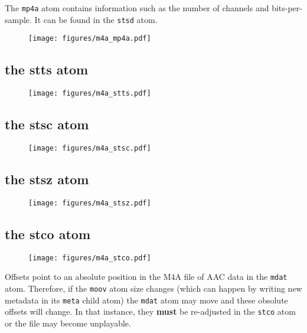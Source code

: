 The \texttt{mp4a} atom contains information such as the number of channels
and bits-per-sample.  It can be found in the \texttt{stsd} atom.

\begin{figure}[h]
\texttt{[image: figures/m4a\_mp4a.pdf]}
\end{figure}

\pagebreak

\subsection{the stts atom}

\begin{figure}[h]
\texttt{[image: figures/m4a\_stts.pdf]}
\end{figure}

\subsection{the stsc atom}

\begin{figure}[h]
\texttt{[image: figures/m4a\_stsc.pdf]}
\end{figure}

\subsection{the stsz atom}

\begin{figure}[h]
\texttt{[image: figures/m4a\_stsz.pdf]}
\end{figure}

\pagebreak

\subsection{the stco atom}

\begin{figure}[h]
\texttt{[image: figures/m4a\_stco.pdf]}
\end{figure}
\par
\noindent
Offsets point to an absolute position in the M4A file of AAC data in
the \texttt{mdat} atom.  Therefore, if the \texttt{moov} atom size changes
(which can happen by writing new metadata in its \texttt{meta} child atom)
the \texttt{mdat} atom may move and these obsolute offsets will change.
In that instance, they \textbf{must}
be re-adjusted in the \texttt{stco} atom or the file may become unplayable.

